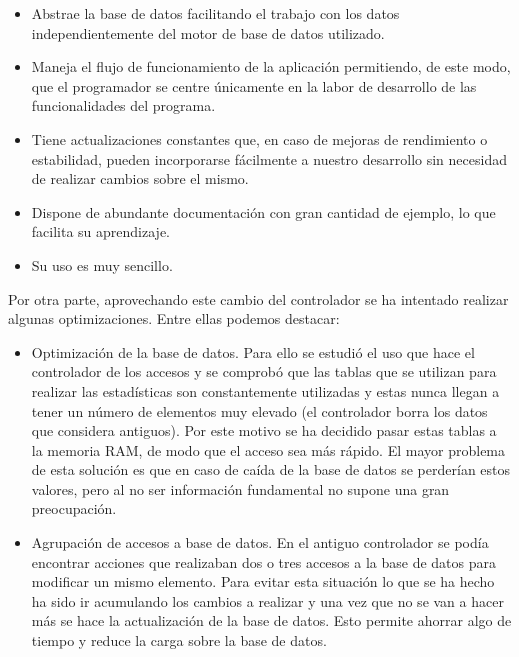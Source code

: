 \begin{itemize}
	\item Abstrae la base de datos facilitando el trabajo con los datos independientemente del motor de base de datos utilizado.
	
	\item Maneja el flujo de funcionamiento de la aplicación permitiendo, de este modo, que el programador se centre únicamente en la labor de desarrollo de las funcionalidades del programa.
	
	\item Tiene actualizaciones constantes que, en caso de mejoras de rendimiento o estabilidad, pueden incorporarse fácilmente a nuestro desarrollo sin necesidad de realizar cambios sobre el mismo.
	
	\item Dispone de abundante documentación con gran cantidad de ejemplo, lo que facilita su aprendizaje.
	
	\item Su uso es muy sencillo.
\end{itemize}

Por otra parte, aprovechando este cambio del controlador se ha intentado realizar algunas optimizaciones. Entre ellas podemos destacar:

\begin{itemize}
	\item Optimización de la base de datos. Para ello se estudió el uso que hace el controlador de los accesos y se comprobó que las tablas que se utilizan para realizar las estadísticas son constantemente utilizadas y estas nunca llegan a tener un número de elementos muy elevado (el controlador borra los datos que considera antiguos). Por este motivo se ha decidido pasar estas tablas a la memoria RAM, de modo que el acceso sea más rápido. El mayor problema de esta solución es que en caso de caída de la base de datos se perderían estos valores, pero al no ser información fundamental no supone una gran preocupación.
	
	\item Agrupación de accesos a base de datos. En el antiguo controlador se podía encontrar acciones que realizaban dos o tres accesos a la base de datos para modificar un mismo elemento. Para evitar esta situación lo que se ha hecho ha sido ir acumulando los cambios a realizar y una vez que no se van a hacer más se hace la actualización de la base de datos. Esto permite ahorrar algo de tiempo y reduce la carga sobre la base de datos.
\end{itemize}

